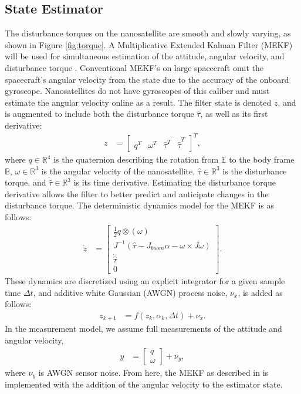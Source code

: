 \subsection{State Estimator}
The disturbance torques on the nanosatellite are smooth and slowly varying, as shown in Figure \ref{fig:torque}. A Multiplicative Extended Kalman Filter (MEKF) will be used for simultaneous estimation of the attitude, angular velocity, and disturbance torque \cite{markley2014}. Conventional MEKF's on large spacecraft omit the spacecraft's angular velocity from the state due to the accuracy of the onboard gyroscope. Nanosatellites do not have gyroscopes of this caliber and must estimate the angular velocity online as a result. The filter state is denoted $z$, and is augmented to include both the disturbance torque $\hat{\tau}$, as well as its first derivative:
\begin{align}
    z &= \begin{bmatrix} q ^T & \omega^T & \hat \tau^T & \dot{\hat \tau}^T\end{bmatrix}^T,
\end{align}
where $q \in {\mathbb{R}}^4$ is the quaternion describing the rotation from $\mathbb{E}$ to the body frame $\mathbb{B}$, $\omega \in {\mathbb{R}}^3$ is the angular velocity of the nanosatellite, $ \hat \tau \in {\mathbb{R}}^3$ is the disturbance torque, and $\dot{\hat \tau} \in {\mathbb{R}}^3$ is its time derivative. Estimating the disturbance torque derivative allows the filter to better predict and anticipate changes in the disturbance torque. The deterministic dynamics model for the MEKF is as follows:
\begin{align}
\dot{z} &=  \begin{bmatrix} \frac{1}{2} q \otimes (\omega) \\ J^{-1}(\hat \tau  - J_{boom}\alpha - \omega \times J\omega )\\ \dot{ \hat{\tau}} \\ 0
\end{bmatrix}.
\end{align}
These dynamics are discretized using an explicit integrator for a given sample time $\Delta t$, and additive white Gaussian (AWGN) process noise, $\nu_x$, is added as follows:
\begin{align}
    z_{k+1} &= f(z_{k},\alpha_k,\Delta t) + \nu_{x}.
\end{align}
In the measurement model, we assume full measurements of the attitude and angular velocity,
\begin{align}
y &= \begin{bmatrix}q \\ \omega \end{bmatrix} + \nu_y,
\end{align}
where $\nu_y$ is AWGN sensor noise. From here, the MEKF as described in \cite{markley2014} is implemented with the addition of the angular velocity to the estimator state. 

